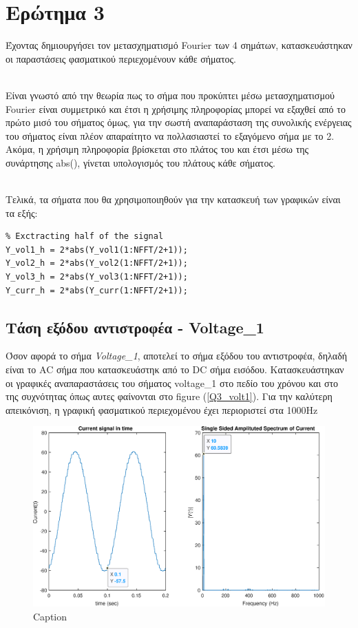 \section*{Ερώτημα 3}
\label{Q3}

Έχοντας δημιουργήσει τον μετασχηματισμό Fourier των 4 σημάτων, κατασκευάστηκαν οι παραστάσεις φασματικού περιεχομένουν κάθε σήματος. 

\noindent\\
Είναι γνωστό από την θεωρία πως το σήμα που προκύπτει μέσω μετασχηματισμού Fourier είναι συμμετρικό και έτσι η χρήσιμης πληροφορίας μπορεί να εξαχθεί από το πρώτο μισό του σήματος όμως, για την σωστή αναπαράσταση της συνολικής ενέργειας του σήματος είναι πλέον απαραίτητο να πολλασιαστεί το εξαγόμενο σήμα με το 2. Ακόμα, η χρήσιμη πληροφορία βρίσκεται στο πλάτος του και έτσι μέσω της συνάρτησης abs(), γίνεται υπολογισμός του πλάτους κάθε σήματος.

\noindent\\
Τελικά, τα σήματα που θα χρησιμοποιηθούν για την κατασκευή των γραφικών είναι τα εξής:
\begin{lstlisting}
% Exctracting half of the signal
Y_vol1_h = 2*abs(Y_vol1(1:NFFT/2+1));
Y_vol2_h = 2*abs(Y_vol2(1:NFFT/2+1));
Y_vol3_h = 2*abs(Y_vol3(1:NFFT/2+1));
Y_curr_h = 2*abs(Y_curr(1:NFFT/2+1));
\end{lstlisting}

\subsection*{Τάση εξόδου αντιστροφέα - Voltage\_1}
\label{Q31}

\noindent
Όσον αφορά το σήμα \textit{Voltage\_1}, αποτελεί το σήμα εξόδου του αντιστροφέα, δηλαδή είναι το AC σήμα που κατασκευάστηκ από το DC σήμα εισόδου. Κατασκευάστηκαν οι γραφικές αναπαραστάσεις του σήματος voltage\_1 στο πεδίο του χρόνου και στο της συχνότητας όπως αυτες φαίνονται στο figure (\ref{Q3_volt1}). Για την καλύτερη απεικόνιση, η γραφική φασματικού περιεχομένου έχει περιοριστεί στα 1000Ηz

\begin{figure}[h]
    \centering
    \includegraphics[width=.8\textwidth]{Images/current_Q3.eps}
    \caption{Caption}
    \label{fig:my_label}
\end{figure}

